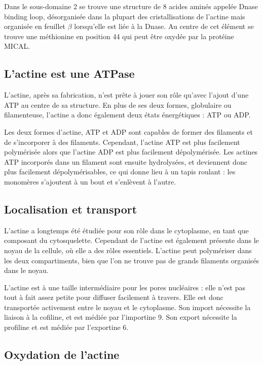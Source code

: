 Dans le sous-domaine 2 se trouve une structure de 8 acides aminés appelée Dnase binding loop, désorganisée dans la plupart des cristallisations de l'actine mais organisée en feuillet $\beta$ lorsqu'elle est liée à la Dnase. Au centre de cet élément se trouve une méthionine en position 44 qui peut être oxydée par la protéine MICAL. 

\subsection{L'actine est une ATPase}

L'actine, après sa fabrication, n'est prête à jouer son rôle qu'avec l'ajout d'une ATP au centre de sa structure.
En plus de ses deux formes, globulaire ou filamenteuse, l'actine a donc également deux états énergétiques : ATP ou ADP.

Les deux formes d'actine, ATP et ADP sont capables de former des filaments et de s'incorporer à des filaments. 
Cependant, l'actine ATP est plus facilement polymérisée alors que l'actine ADP est plus facilement dépolymérisée. 
Les actines ATP incorporés dans un filament sont ensuite hydrolysées, et deviennent donc plus facilement dépolymérisables, ce qui donne lieu à un tapis roulant : les monomères s'ajoutent à un bout et s'enlèvent à l'autre. 

\subsection{Localisation et transport}

L'actine a longtemps été étudiée pour son rôle dans le cytoplasme, en tant que composant du cytosquelette. Cependant de l'actine est également présente dans le noyau de la cellule, où elle a des rôles essentiels. 
L'actine peut polymériser dans les deux compartiments, bien que l'on ne trouve pas de grands filaments organisés dans le noyau. 

L'actine est à une taille intermédiaire pour les pores nucléaires : elle n'est pas tout à fait assez petite pour diffuser facilement à travers. Elle est donc transportée activement entre le noyau et le cytoplasme. 
Son import nécessite la liaison à la cofiline, et est médiée par l'importine 9. Son export nécessite la profiline et est médiée par l'exportine 6. 



\subsection{Oxydation de l'actine}

